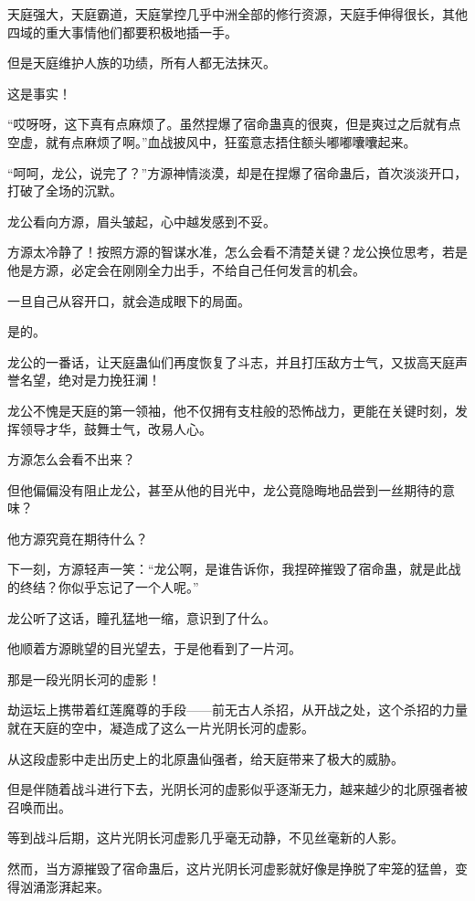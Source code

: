 \begin{this_body}
天庭强大，天庭霸道，天庭掌控几乎中洲全部的修行资源，天庭手伸得很长，其他四域的重大事情他们都要积极地插一手。

但是天庭维护人族的功绩，所有人都无法抹灭。

这是事实！

“哎呀呀，这下真有点麻烦了。虽然捏爆了宿命蛊真的很爽，但是爽过之后就有点空虚，就有点麻烦了啊。”血战披风中，狂蛮意志捂住额头嘟嘟囔囔起来。

“呵呵，龙公，说完了？”方源神情淡漠，却是在捏爆了宿命蛊后，首次淡淡开口，打破了全场的沉默。

龙公看向方源，眉头皱起，心中越发感到不妥。

方源太冷静了！按照方源的智谋水准，怎么会看不清楚关键？龙公换位思考，若是他是方源，必定会在刚刚全力出手，不给自己任何发言的机会。

一旦自己从容开口，就会造成眼下的局面。

是的。

龙公的一番话，让天庭蛊仙们再度恢复了斗志，并且打压敌方士气，又拔高天庭声誉名望，绝对是力挽狂澜！

龙公不愧是天庭的第一领袖，他不仅拥有支柱般的恐怖战力，更能在关键时刻，发挥领导才华，鼓舞士气，改易人心。

方源怎么会看不出来？

但他偏偏没有阻止龙公，甚至从他的目光中，龙公竟隐晦地品尝到一丝期待的意味？

他方源究竟在期待什么？

下一刻，方源轻声一笑：“龙公啊，是谁告诉你，我捏碎摧毁了宿命蛊，就是此战的终结？你似乎忘记了一个人呢。”

龙公听了这话，瞳孔猛地一缩，意识到了什么。

他顺着方源眺望的目光望去，于是他看到了一片河。

那是一段光阴长河的虚影！

劫运坛上携带着红莲魔尊的手段——前无古人杀招，从开战之处，这个杀招的力量就在天庭的空中，凝造成了这么一片光阴长河的虚影。

从这段虚影中走出历史上的北原蛊仙强者，给天庭带来了极大的威胁。

但是伴随着战斗进行下去，光阴长河的虚影似乎逐渐无力，越来越少的北原强者被召唤而出。

等到战斗后期，这片光阴长河虚影几乎毫无动静，不见丝毫新的人影。

然而，当方源摧毁了宿命蛊后，这片光阴长河虚影就好像是挣脱了牢笼的猛兽，变得汹涌澎湃起来。


\end{this_body}
